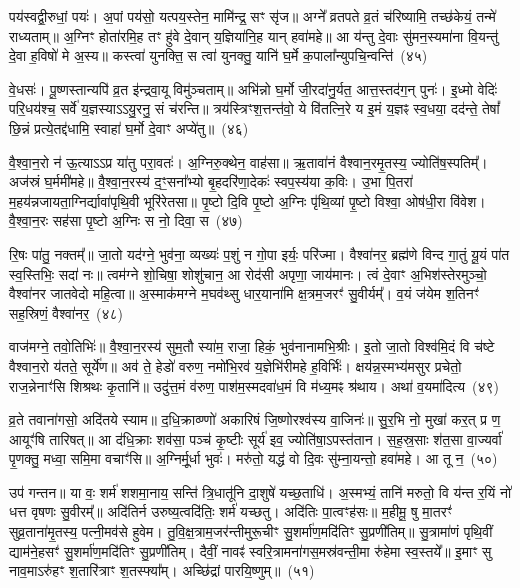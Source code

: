 पय॑स्वद्वी॒रुधां॒ पयः॑। अ॒पां पय॑सो॒ यत्पय॒स्तेन॒ मामि॑न्द्र॒ सꣳ सृ॑ज॥ अग्ने᳚ व्रतपते व्र॒तं च॑रिष्यामि॒ तच्छ॑केयं॒ तन्मे॑ राध्यताम्॥ अ॒ग्निꣳ होता॑रमि॒ह तꣳ हु॑वे दे॒वान् य॒ज्ञिया॑नि॒ह यान् हवा॑महे॥ आ य॑न्तु दे॒वाः सु॑मन॒स्यमा॑ना वि॒यन्तु॑ दे॒वा ह॒विषो॑ मे अ॒स्य॥ कस्त्वा॑ युनक्ति॒ स त्वा॑ युनक्तु॒ यानि॑ घ॒र्मे क॒पाला᳚न्युपचि॒न्वन्ति॑~(४५)\ip

वे॒धसः॑। पू॒ष्णस्तान्यपि॑ व्र॒त इ॑न्द्रवा॒यू विमु॑ञ्चताम्॥ अभि॑न्नो घ॒र्मो जी॒रदा॑नु॒र्यत॒ आत्त॒स्तद॑ग॒न् पुनः॑। इ॒ध्मो वेदिः॑ परि॒धय॑श्च॒ सर्वे॑ य॒ज्ञस्या\-ऽऽ\-यु॒रनु॒ सं च॑रन्ति॥ त्रय॑स्त्रिꣳश॒त्तन्त॑वो॒ ये वि॑तत्नि॒रे य इ॒मं य॒ज्ञꣴ स्व॒धया॒ दद॑न्ते॒ तेषां᳚ छि॒न्नं प्रत्ये॒तद्द॑धामि॒ स्वाहा॑ घ॒र्मो दे॒वाꣳ अप्ये॑तु॥~(४६)\ip

{}%

वै॒श्वा॒न॒रो न॑ ऊ॒त्या\-ऽऽ\-प्र या॑तु परा॒वतः॑। अ॒ग्निरु॒क्थेन॒ वाह॑सा॥ ऋ॒तावा॑नं वैश्वान॒रमृ॒तस्य॒ ज्योति॑ष॒स्पतिम्᳚। अज॑स्रं घ॒र्ममी॑महे॥ वै॒श्वा॒न॒रस्य॑ द॒ꣳ॒सना᳚भ्यो बृ॒हदरि॑णा॒देकः॑ स्वप॒स्य॑या क॒विः। उ॒भा पि॒तरा॑ म॒हय॑न्नजायता॒ग्निर्द्यावा॑\-पृथि॒वी भूरि॑रेतसा॥ पृ॒ष्टो दि॒वि पृ॒ष्टो अ॒ग्निः पृ॑थि॒व्यां पृ॒ष्टो विश्वा॒ ओष॑धी॒रा वि॑वेश। वै॒श्वा॒न॒रः सह॑सा पृ॒ष्टो अ॒ग्निः स नो॒ दिवा॒ स~(४७)\ip

रि॒षः पा॑तु॒ नक्तम्᳚॥ जा॒तो यद॑ग्ने॒ भुव॑ना॒ व्यख्यः॑ प॒शुं न गो॒पा इर्यः॒ परि॑ज्मा। वैश्वा॑नर॒ ब्रह्म॑णे विन्द गा॒तुं यू॒यं पा॑त स्व॒स्तिभिः॒ सदा॑ नः॥ त्वम॑ग्ने शो॒चिषा॒ शोशु॑चान॒ आ रोद॑सी अपृणा॒ जाय॑मानः। त्वं दे॒वाꣳ अ॒भिश॑स्तेरमुञ्चो॒ वैश्वा॑नर जातवेदो महि॒त्वा॥ अ॒स्माक॑मग्ने म॒घव॑थ्सु धार॒याना॑मि क्ष॒त्रम॒जरꣳ॑ सु॒वीर्यम्᳚। व॒यं ज॑येम श॒तिनꣳ॑ सह॒स्रिणं॒ वैश्वा॑नर॒~(४८)\ip

वाज॑मग्ने॒ तवो॒तिभिः॑॥ वै॒श्वा॒न॒रस्य॑ सुम॒तौ स्या॑म॒ राजा॒ हिकं॒ भुव॑नानामभि॒श्रीः। इ॒तो जा॒तो विश्व॑मि॒दं वि च॑ष्टे वैश्वान॒रो य॑तते॒ सूर्ये॑ण॥ अव॑ ते॒ हेडो॑ वरुण॒ नमो॑\-भि॒रव॑ य॒ज्ञेभि॑रीमहे ह॒विर्भिः॑। क्षय॑न्न॒स्मभ्य॑मसुर प्रचेतो॒ राज॒न्नेनाꣳ॑सि शिश्रथः कृ॒तानि॑॥ उदु॑त्त॒मं व॑रुण॒ पाश॑\-म॒स्मद\-वा॑ध॒मं वि म॑ध्य॒मꣴ श्र॑थाय। अथा॑ व॒यमा॑दित्य~(४९)\ip

व्र॒ते तवाना॑गसो॒ अदि॑तये स्याम॥ द॒धि॒क्राव्ण्णो॑ अकारिषं जि॒ष्णोरश्व॑स्य वा॒जिनः॑॥ सु॒र॒भि नो॒ मुखा॑ कर॒त् प्र ण॒ आयूꣳ॑षि तारिषत्॥ आ द॑धि॒क्राः शव॑सा॒ पञ्च॑ कृ॒ष्टीः सूर्य॑ इव॒ ज्योति॑षा॒\-ऽपस्त॑तान। स॒ह॒स्र॒साः श॑त॒सा वा॒ज्यर्वा॑ पृ॒णक्तु॒ मध्वा॒ समि॒मा वचाꣳ॑सि॥ अ॒ग्निर्मू॒र्धा भुवः॑। मरु॑तो॒ यद्ध॑ वो दि॒वः सु॑म्ना॒यन्तो॒ हवा॑महे। आ तू न॒~(५०)\ip

उप॑ गन्तन॥ या वः॒ शर्म॑ शशमा॒नाय॒ सन्ति॑ त्रि॒धातू॑नि दा॒शुषे॑ यच्छ॒ताधि॑। अ॒स्मभ्यं॒ तानि॑ मरुतो॒ वि य॑न्त र॒यिं नो॑ धत्त वृषणः सु॒वीरम्᳚॥ अदि॑तिर्न उरुष्य॒त्वदि॑तिः॒ शर्म॑ यच्छतु। अदि॑तिः पा॒त्वꣳह॑सः॥ म॒हीमू॒ षु मा॒तरꣳ॑ सुव्र॒ता\-ना॑\-मृ॒तस्य॒ पत्नी॒मव॑से हुवेम। तु॒वि॒क्ष॒त्रा\-म॒जर॑न्ती\-मुरू॒चीꣳ सु॒शर्मा॑ण॒मदि॑तिꣳ सु॒प्रणी॑तिम्॥ सु॒त्रामा॑णं पृथि॒वीं द्याम॑ने॒हसꣳ॑ सु॒शर्मा॑ण॒मदि॑तिꣳ सु॒प्रणी॑तिम्। दैवीं॒ नावꣴ॑ स्वरि॒त्रा\-मना॑\-गस॒मस्र॑वन्ती॒मा रु॑हेमा स्व॒स्तये᳚॥ इ॒माꣳ सु नाव॒मा\-ऽरु॑हꣳ श॒तारि॑त्राꣳ श॒तस्फ्या᳚म्। अच्छि॑द्रां पारयि॒ष्णुम्॥~(५१)\ip

